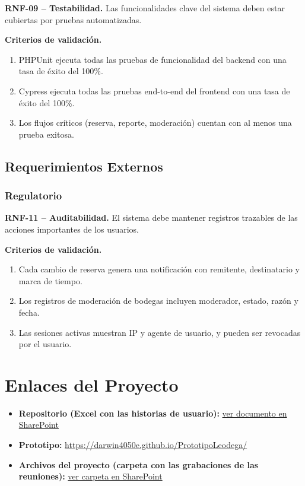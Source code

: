 \textbf{RNF-09 -- Testabilidad.} \label{req:RNF-09}
Las funcionalidades clave del sistema deben estar cubiertas por pruebas automatizadas.

\textbf{Criterios de validación.}
\begin{enumerate}
\item PHPUnit ejecuta todas las pruebas de funcionalidad del backend con una tasa de éxito del 100\%.
\item Cypress ejecuta todas las pruebas end-to-end del frontend con una tasa de éxito del 100\%.
\item Los flujos críticos (reserva, reporte, moderación) cuentan con al menos una prueba exitosa.
\end{enumerate}

\subsection{Requerimientos Externos}

\subsubsection*{Regulatorio}

\textbf{RNF-11 -- Auditabilidad.} \label{req:RNF-11}
El sistema debe mantener registros trazables de las acciones importantes de los usuarios.

\textbf{Criterios de validación.}
\begin{enumerate}
\item Cada cambio de reserva genera una notificación con remitente, destinatario y marca de tiempo.
\item Los registros de moderación de bodegas incluyen moderador, estado, razón y fecha.
\item Las sesiones activas muestran IP y agente de usuario, y pueden ser revocadas por el usuario.
\end{enumerate}

\clearpage

\section{Enlaces del Proyecto}
\label{anexo:ers-enlaces}

\begin{itemize}
    \item \textbf{Repositorio (Excel con las historias de usuario):} \href{https://espolec-my.sharepoint.com/:x:/g/personal/dldiaz_espol_edu_ec/IQBBQnkoG3uFRa2nX5pI2kURAa8pNF6cpxQ1POtHXTjjAUw?e=1B57HO}{ver documento en SharePoint}
    \item \textbf{Prototipo:} \url{https://darwin4050e.github.io/PrototipoLeodega/}
    \item \textbf{Archivos del proyecto (carpeta con las grabaciones de las reuniones):} \href{https://espolec-my.sharepoint.com/:f:/g/personal/dldiaz_espol_edu_ec/IgCEzk7GtyQvTI93FPW-tZN4Aaz2tQWK37bkN083-wlybdM?e=1sSQTk}{ver carpeta en SharePoint}
\end{itemize}

